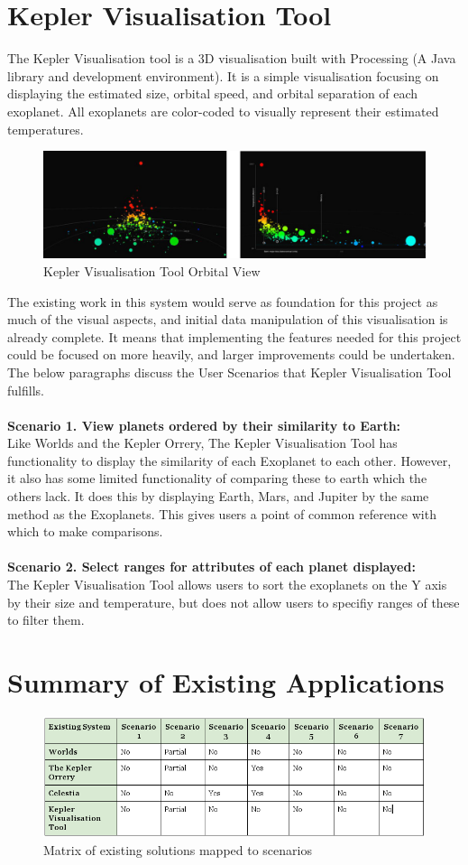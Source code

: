 \section{Kepler Visualisation Tool}
\label{sec:kep}
The Kepler Visualisation tool \cite{kepler_github, kepler_article} is a 3D
visualisation built with Processing (A Java library and development
environment). It is a simple visualisation focusing
on displaying the estimated size, orbital speed, and orbital
separation of each exoplanet. All exoplanets are color-coded to visually
represent
their estimated temperatures.
\begin{figure}[H]
  \centering
      \includegraphics[width=1\textwidth]{images/kepler.jpg}
  \caption{Kepler Visualisation Tool Orbital View}
\end{figure}

The existing work in this system would serve as foundation for this project as
much of the visual aspects, and initial data manipulation of this visualisation
is already complete. It means that implementing the features
needed for this project could be focused on more heavily, and larger
improvements could be undertaken. The below paragraphs
discuss the User Scenarios that Kepler Visualisation Tool fulfills.
\\\\
{\bf Scenario 1. View planets ordered by their similarity to Earth:\\}
Like Worlds and the Kepler Orrery, The Kepler Visualisation Tool has
functionality to display the similarity of each Exoplanet to each other.
However, it also has some limited functionality of comparing these to earth
which the others lack. It does this by displaying Earth, Mars, and Jupiter by
the same method as the Exoplanets. This gives users a point of common reference
with which to make comparisons.
\\\\
{\bf Scenario 2. Select ranges for attributes of each planet displayed:\\}
The Kepler Visualisation Tool allows users to sort the exoplanets on the Y axis
by their size and temperature, but does not allow users to specifiy ranges of
these to filter them.
\section{Summary of Existing Applications}
\begin{figure}[H]
  \centering
      \includegraphics[width=1\textwidth]{images/existing.png}
  \caption{Matrix of existing solutions mapped to scenarios}  
    \label{fig:existing}
\end{figure}


